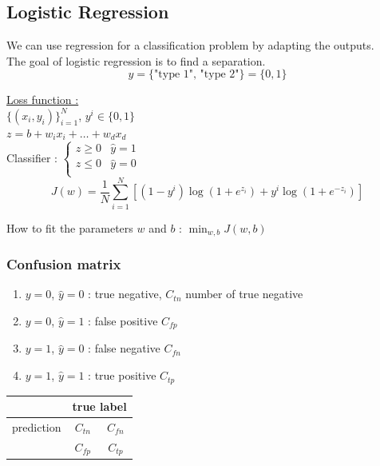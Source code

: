 \documentclass[../main.tex]{subfiles}
\begin{document}
\subsection{Logistic Regression}
We can use regression for a classification problem by adapting the outputs.\\

The goal of logistic regression is to find a separation.\\
\begin{equation}
    y = \{ \text{"type 1", "type 2"} \} = \{0,1\}
\end{equation}

\quad \underline{Loss function :}\\
$\{ (x_i, y_i)\}_{i=1}^N$, $y^i \in \{0,1\}$\\
$z = b+w_ix_i + \dots + w_dx_d$\\
Classifier : $\begin{cases}
    z\geq 0 & \hat{y}=1\\
    z \leq 0 & \hat{y}=0\\
\end{cases}$
\begin{equation}
    J(w) = \frac{1}{N} \sum_{i=1}^N [(1-y^i)\log(1+e^{z_i}) + y^i \log(1+e^{-z_i})]
\end{equation}

How to fit the parameters $w$ and $b$ : $\min_{w,b}J(w,b)$\\

\subsubsection{Confusion matrix}
\begin{enumerate}
    \item $y=0$, $\hat{y}=0$ : true negative, $C_{tn}$ number of true negative\\
    \item $y=0$, $\hat{y}=1$ : false positive $C_{fp}$\\
    \item $y=1$, $\hat{y}=0$ : false negative $C_{fn}$\\
    \item $y=1$, $\hat{y}=1$ : true positive $C_{tp}$\\
\end{enumerate}

\begin{table}[hbt!]
    \centering
    \begin{tabular}{c|c|c|}
    
    &\multicolumn{2}{c}{true label}\\
    \hline
    prediction & $C_{tn}$ & $C_{fn}$ \\ \cline{2-3}
     & $C_{fp}$ & $C_{tp}$\\ \cline{2-3}
    \end{tabular}
\end{table}
\end{document}
